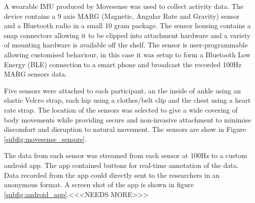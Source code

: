 \documentclass[sensors,article,submit,moreauthors,pdftex]{Definitions/mdpi}
\begin{document}
A wearable IMU produced by Movesense was used to collect activity data. The device contains a 9 axis MARG (Magnetic, Angular Rate and Gravity) sensor and a Bluetooth radio in a small 10 gram package. The sensor housing contains a snap connectors allowing it to be clipped into attachment hardware and a variety of mounting hardware is available off the shelf. The sensor is user-programmable allowing customised behaviour, in this case it was setup to form a Bluetooth Low Energy (BLE) connection to a smart phone and broadcast the recorded 100Hz MARG sensors data. 

Five sensors were attached to each participant, an the inside of ankle using an elastic Velcro strap, each hip using a clothes/belt clip and the chest using a heart rate strap. The location of the sensors was selected to give a wide covering of body movements while providing secure and non-invasive attachment to minimise discomfort and disruption to natural movement. The sensors are show in Figure \ref{subfig:movesense_sensors}.

The data from each sensor was streamed from each sensor at 100Hz to a custom android app. The app contained buttons for real-time annotation of the data. Data recorded from the app could directly sent to the researchers in an anonymous format. A screen shot of the app is shown in figure \ref{subfig:android_app}.<<<NEEDS MORE>>>
\end{document}
